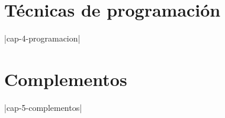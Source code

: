 \documentclass[landscape,10pt,oneside,oldfontcommands]{memoir} %
\begin{document}
\chapter{T\'ecnicas de programaci\'on}\label{prog}
\thispagestyle{empty}
\monta|cap-4-programacion|

\chapter{Complementos}
\thispagestyle{empty}
\monta|cap-5-complementos|
\end{document}
